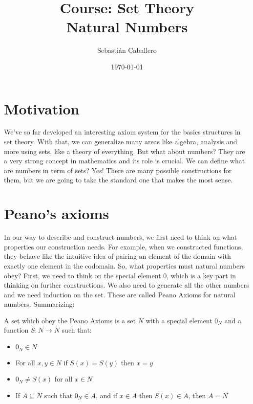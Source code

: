 \documentclass{tufte-handout}
\title{Course: Set Theory \\ \Large Natural Numbers}
\author{Sebastián Caballero}
\date{\today}
\begin{document}
\maketitle

\section{Motivation}
We've so far developed an interesting axiom system for the basics structures in set theory. With that, we can generalize many areas like algebra, analysis and more using sets, like a theory of everything. But what about numbers? They are a very strong concept in mathematics and its role is crucial. We can define what are numbers in term of sets? Yes! There are many possible constructions for them, but we are going to take the standard one that makes the most sense.\\

\section{Peano's axioms}
In our way to describe and construct numbers, we first need to think on what properties our construction needs. For example, when we constructed functions, they behave like the intuitive idea of pairing an element of the domain with exactly one element in the codomain. So, what properties must natural numbers obey? First, we need to think on the special element $0$, which is a key part in thinking on further constructions. We also need to generate all the other numbers and we need induction on the set. These are called Peano Axioms for natural numbers. Summarizing:

\begin{axiom}
	A set which obey the Peano Axioms is a set $N$ with a special element $0_N$ and a function $S: N \to N$ such that:
	\begin{itemize}
		\item $0_N \in N$
		\item For all $x, y \in N$ if $S(x) = S(y)$ then $x = y$
		\item $0_N \neq S(x)$ for all $x \in N$
		\item If $A \subseteq N$ such that $0_N \in A$, and if $x \in A$ then $S(x) \in A$, then $A = N$
	\end{itemize}
\end{axiom}
\end{document}

